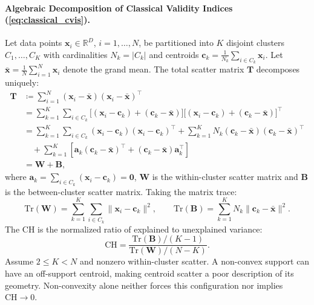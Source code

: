 \paragraph{Algebraic Decomposition of Classical Validity Indices
(\cref{eq:classical_cvis}).}
Let data points $\mathbf x_i\in\mathbb R^D$, $i=1,\ldots,N$,
be partitioned into $K$ disjoint clusters $C_1,\ldots,C_K$ with cardinalities
$N_k = |C_k|$ and centroids $\mathbf{c}_k = \frac{1}{N_k}\sum_{i \in
C_k} \mathbf{x}_i$.
Let $\bar{\mathbf{x}} = \frac{1}{N}\sum_{i=1}^N \mathbf{x}_i$ denote
the grand mean.
The total scatter matrix $\mathbf{T}$ decomposes uniquely:
\begin{equation}
  \begin{aligned}
    \mathbf{T} &\coloneqq \sum_{i=1}^N (\mathbf{x}_i -
    \bar{\mathbf{x}})(\mathbf{x}_i - \bar{\mathbf{x}})^\top \\
    &= \sum_{k=1}^K \sum_{i \in C_k} \bigl[(\mathbf{x}_i -
    \mathbf{c}_k) + (\mathbf{c}_k - \bar{\mathbf{x}})\bigr]
    \bigl[(\mathbf{x}_i - \mathbf{c}_k) + (\mathbf{c}_k -
    \bar{\mathbf{x}})\bigr]^\top \\
    &= \sum_{k=1}^K \sum_{i \in C_k} (\mathbf{x}_i -
    \mathbf{c}_k)(\mathbf{x}_i - \mathbf{c}_k)^\top
    + \sum_{k=1}^K N_k (\mathbf{c}_k -
    \bar{\mathbf{x}})(\mathbf{c}_k - \bar{\mathbf{x}})^\top \\
    &\quad + \sum_{k=1}^K \left[
      \mathbf{a}_k(\mathbf{c}_k-\bar{\mathbf{x}})^\top
    +(\mathbf{c}_k-\bar{\mathbf{x}})\mathbf{a}_k^\top\right] \\
    &= \mathbf{W} + \mathbf{B},
  \end{aligned}
  \label{eq:supp_scatter_decomposition}
\end{equation}
where $\mathbf{a}_k=\sum_{i\in C_k}(\mathbf{x}_i-\mathbf{c}_k)=\mathbf{0}$,
$\mathbf{W}$ is the within-cluster scatter matrix and $\mathbf{B}$ is the
between-cluster scatter matrix. Taking the matrix trace:
\begin{equation}
  \mathrm{Tr}(\mathbf{W}) = \sum_{k=1}^K \sum_{i \in C_k}
  \|\mathbf{x}_i - \mathbf{c}_k\|^2, \qquad
  \mathrm{Tr}(\mathbf{B}) = \sum_{k=1}^K N_k \|\mathbf{c}_k -
  \bar{\mathbf{x}}\|^2.
\end{equation}
The \acf{CH} is the normalized ratio of explained to unexplained variance:
\begin{equation}
  \mathrm{CH} = \frac{\mathrm{Tr}(\mathbf{B}) / (K -
  1)}{\mathrm{Tr}(\mathbf{W}) / (N - K)}.
\end{equation}
Assume $2\le K<N$ and nonzero within-cluster scatter. A non-convex
support can have an off-support centroid, making centroid scatter a poor
description of its geometry. Non-convexity alone neither forces this
configuration nor implies $\mathrm{CH}\to0$.

